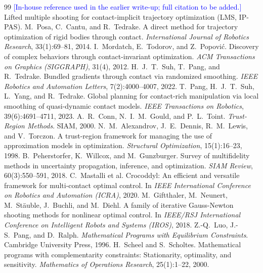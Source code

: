 \documentclass[11pt]{article}
\theoremstyle{remark}
\newcommand{\note}[1]{\textcolor{blue}{[#1]}}
\begin{document}
\begin{thebibliography}{99}
\small
{} \note{In-house reference used in the earlier write-up; full citation to be added.} Lifted multiple shooting for contact-implicit trajectory optimization (LMS, IP-PAS).
 M.~Posa, C.~Cantu, and R.~Tedrake. A direct method for trajectory optimization of rigid bodies through contact. \emph{International Journal of Robotics Research}, 33(1):69--81, 2014.
 I.~Mordatch, E.~Todorov, and Z.~Popovi\'c. Discovery of complex behaviors through contact-invariant optimization. \emph{ACM Transactions on Graphics (SIGGRAPH)}, 31(4), 2012.
 H.~J.~T.~Suh, T.~Pang, and R.~Tedrake. Bundled gradients through contact via randomized smoothing. \emph{IEEE Robotics and Automation Letters}, 7(2):4000--4007, 2022.
 T.~Pang, H.~J.~T.~Suh, L.~Yang, and R.~Tedrake. Global planning for contact-rich manipulation via local smoothing of quasi-dynamic contact models. \emph{IEEE Transactions on Robotics}, 39(6):4691--4711, 2023.
 A.~R.~Conn, N.~I.~M.~Gould, and P.~L.~Toint. \emph{Trust-Region Methods}. SIAM, 2000.
 N.~M.~Alexandrov, J.~E.~Dennis, R.~M.~Lewis, and V.~Torczon. A trust-region framework for managing the use of approximation models in optimization. \emph{Structural Optimization}, 15(1):16--23, 1998.
 B.~Peherstorfer, K.~Willcox, and M.~Gunzburger. Survey of multifidelity methods in uncertainty propagation, inference, and optimization. \emph{SIAM Review}, 60(3):550--591, 2018.
 C.~Mastalli et al. Crocoddyl: An efficient and versatile framework for multi-contact optimal control. In \emph{IEEE International Conference on Robotics and Automation (ICRA)}, 2020.
 M.~Giftthaler, M.~Neunert, M.~St\"auble, J.~Buchli, and M.~Diehl. A family of iterative Gauss-Newton shooting methods for nonlinear optimal control. In \emph{IEEE/RSJ International Conference on Intelligent Robots and Systems (IROS)}, 2018.
 Z.-Q.~Luo, J.-S.~Pang, and D.~Ralph. \emph{Mathematical Programs with Equilibrium Constraints}. Cambridge University Press, 1996.
 H.~Scheel and S.~Scholtes. Mathematical programs with complementarity constraints: Stationarity, optimality, and sensitivity. \emph{Mathematics of Operations Research}, 25(1):1--22, 2000.
\end{thebibliography}
\end{document}
